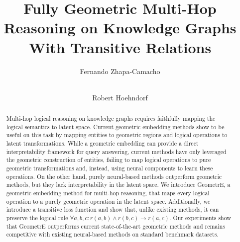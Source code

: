 \documentclass[runningheads]{llncs}
\newcommand{\method}{GeometrE}
\begin{document}
%
\title{Fully Geometric Multi-Hop Reasoning on Knowledge Graphs With
  Transitive Relations}
% 
%
\author{Fernando Zhapa-Camacho \and \\
  Robert Hoehndorf
}

%


  
\maketitle              %
%
\begin{abstract}
  Multi-hop logical reasoning on knowledge graphs requires faithfully
  mapping the logical semantics to latent space. Current geometric
  embedding methods show to be useful on this task by mapping entities
  to geometric regions and logical operations to latent
  transformations. While a geometric embedding can provide a direct
  interpretability framework for query answering, current methods have
  only leveraged the geometric construction of entities, failing to
  map logical operations to pure geometric transformations and,
  instead, using neural components to learn these operations. On the
  other hand, purely neural-based methods outperform geometric
  methods, but they lack interpretability in the latent space. We
  introduce \method{}, a geometric embedding method for multi-hop
  reasoning, that maps every logical operation to a purely geometric
  operation in the latent space. Additionally, we introduce a
  transitive loss function and show that, unlike existing methods, it
  can preserve the logical rule
  $\forall a,b,c: r(a,b) \land r(b,c) \to r(a,c)$. Our experiments
  show that \method{} outperforms current state-of-the-art geometric
  methods and remains competitive with existing neural-based methods
  on standard benchmark datasets.

\end{abstract}
%
%
%
\end{document}
